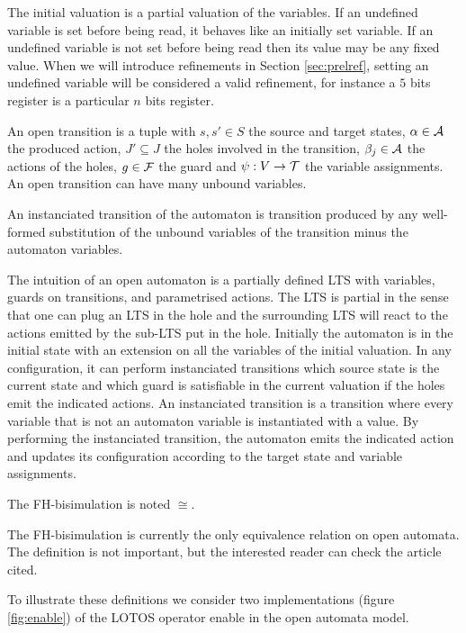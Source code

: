 \documentclass{article}
\begin{document}
The initial valuation is a partial valuation of the variables.
If an undefined variable is set before being read, it behaves like an initially set variable.
If an undefined variable is not set before being read then its value may be any fixed value.
When we will introduce refinements in Section \ref{sec:prelref}, setting an undefined variable will be considered a valid refinement, for instance a \(5\) bits register is a particular \(n\) bits register.
\begin{defi}
An open transition is a tuple \nmm{\OTg} with \(s, s' \in S\) the source and target states, \(\alpha \in \mathcal{A}\) the produced action, \(J' \subseteq J\) the holes involved in the transition, \(\beta_j \in \mathcal{A}\) the actions of the holes, \(g \in {\mathcal{F}}\) the guard and \(\psi: V \to {\mathcal{T}}\) the variable assignments.
An open transition can have many unbound variables.

An instanciated transition of the automaton is transition produced by any well-formed substitution of the unbound variables of the transition minus the automaton variables.
\end{defi}
The intuition of an open automaton is a partially defined LTS with variables, guards on transitions, and parametrised actions.
The LTS is partial in the sense that one can plug an LTS in the hole and the surrounding LTS will react to the actions emitted by the sub-LTS put in the hole.
Initially the automaton is in the initial state with an extension on all the variables of the initial valuation.
In any configuration, it can perform instanciated transitions which source state is the current state and which guard is satisfiable in the current valuation if the holes emit the indicated actions.
An instanciated transition is a transition where every variable that is not an automaton variable is instantiated with a value.
By performing the instanciated transition, the automaton emits the indicated action and updates its configuration according to the target state and variable assignments.
\begin{noti}[FH-bisimulation]
The FH-bisimulation \cite{henrio:01055091} is noted \(\cong\).

The FH-bisimulation is currently the only equivalence relation on open automata.
The definition is not important, but the interested reader can check the article cited.
\end{noti}
To illustrate these definitions we consider two implementations (figure \ref{fig:enable}) of the LOTOS \cite{ISOLOTOS} operator enable in the open automata model.
\end{document}
